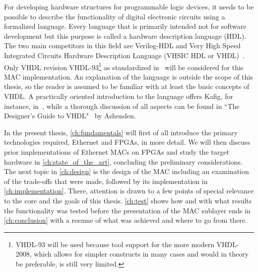 \documentclass[a4paper, 11pt, oneside]{Thesis}  %
\begin{document}

For developing hardware structures for programmable logic devices, it needs to be possible to describe the functionality of digital electronic circuits using a formalized language. Every language that is primarily intended not for software development but this purpose is called a hardware description language (HDL). The two main competitors in this field are Verilog-HDL and Very High Speed Integrated Circuits Hardware Description Language (VHSIC HDL or VHDL)~\cite{DigSysDesign}. Only VHDL revision VHDL-93\footnote{VHDL-93 will be used because tool support for the more modern VHDL-2008, which allows for simpler constructs in many cases and would in theory be preferable, is still very limited.} as standardized in~\cite{VHDLStandard} will be considered for this MAC implementation. An explanation of the language is outside the scope of this thesis, so the reader is assumed to be familiar with at least the basic concepts of VHDL. A practically oriented introduction to the language offers Kafig, for instance, in~\cite{VHDL101}, while a thorough discussion of all aspects can be found in ``The Designer's Guide to VHDL"~\cite{VHDLDesignerGuide} by Ashenden.


In the present thesis, \cref{ch:fundamentals} will first of all introduce the primary technologies required, Ethernet and FPGAs, in more detail. We will then discuss prior implementations of Ethernet MACs on FPGAs and study the target hardware in \cref{ch:state_of_the_art}, concluding the preliminary considerations. The next topic in \cref{ch:design} is the design of the MAC including an examination of the trade-offs that were made, followed by its implementation in \cref{ch:implementation}. There, attention is drawn to a few points of special relevance to the core and the goals of this thesis. \cref{ch:test} shows how and with what results the functionality was tested before the presentation of the MAC sublayer ends in \cref{ch:conclusion} with a resume of what was achieved and where to go from there.
\end{document}
